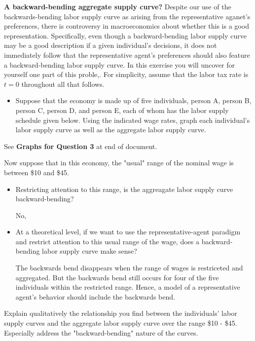 \documentclass[11pt]{SelfArxOneColBMN}
\begin{document}
\begin{exercise}
	\textbf{A backward-bending aggregate supply curve?} Despite our use of the backwards-bending labor supply curve as arising from the representative aganet's preferences, there is controversy in macroeconomics about whether this is a good representation. Specifically, even though a backward-bending labor supply curve may be a good description if a given individual's decisions, it does not immediately follow that the representative agent's preferences should also feature a backward-bending labor supply curve. In this exercise you will uncover for yourself one part of this proble,. For simplicity, assume that the labor tax rate is $t = 0$ throughout all that follows.
	\begin{itemize}
		\item Suppose that the economy is made up of five individuals, person A, person B, person C, person D, and person E, each of whom has the labor supply schedule given below. Using the indicated wage rates, graph each individual's labor supply curve as well as the aggregate labor supply curve.
	\end{itemize}
	\begin{solution}
		See \textbf{Graphs for Question 3} at end of document.
	\end{solution}
\noindent Now suppose that in this economy, the "usual" range of the nominal wage is between \$10 and \$45.
	\begin{itemize}
		\item Restricting attention to this range, is the aggreagate labor supply curve backward-bending?
		\begin{solution}
			No,
		\end{solution}
		\item At a theoretical level, if we want to use the representative-agent paradigm and restrict attention to this usual range of the wage, does a backward-bending labor supply curve make sense?
		\begin{solution}
			The backwards bend disappears when the range of wages is restriceted and aggregated. But the backwards bend still occurs for four of the five individuals within the restricted range. Hence, a model of a representative agent's behavior should include the backwards bend. 
		\end{solution}
	\end{itemize}
	Explain qualitatively the relationship you find between the individuals' labor supply curves and the aggregate labor supply curve over the range \$10 - \$45. Especially address the "backward-bending" nature of the curves.
\end{exercise}
\end{document}
